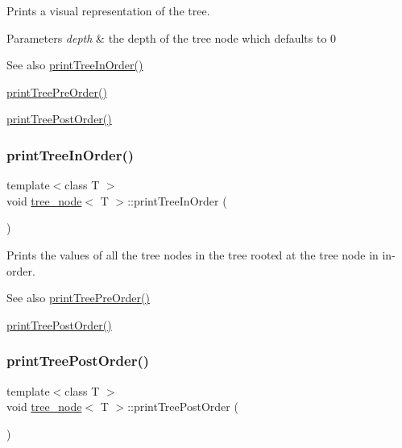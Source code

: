 Prints a visual representation of the tree. 
\begin{DoxyParams}{Parameters}
{\em depth} & the depth of the tree node which defaults to 0 \\
\hline
\end{DoxyParams}
\begin{DoxySeeAlso}{See also}
\hyperlink{classtree__node_ae87818a195621d4defc1cde67e7219ee}{print\+Tree\+In\+Order()} 

\hyperlink{classtree__node_a2ca4e1521e6620bbe2418a9636a109a8}{print\+Tree\+Pre\+Order()} 

\hyperlink{classtree__node_a4bfdd2b618c15252fcfbeab46ca05861}{print\+Tree\+Post\+Order()} 
\end{DoxySeeAlso}
\mbox{\label{classtree__node_ae87818a195621d4defc1cde67e7219ee}} 
\subsubsection{\texorpdfstring{print\+Tree\+In\+Order()}{printTreeInOrder()}}
{\footnotesize\ttfamily template$<$class T $>$ \\
void \hyperlink{classtree__node}{tree\+\_\+node}$<$ T $>$\+::print\+Tree\+In\+Order (\begin{DoxyParamCaption}{ }\end{DoxyParamCaption})}

Prints the values of all the tree nodes in the tree rooted at the tree node in in-\/order. \begin{DoxySeeAlso}{See also}
\hyperlink{classtree__node_a2ca4e1521e6620bbe2418a9636a109a8}{print\+Tree\+Pre\+Order()} 

\hyperlink{classtree__node_a4bfdd2b618c15252fcfbeab46ca05861}{print\+Tree\+Post\+Order()} 
\end{DoxySeeAlso}
\mbox{\label{classtree__node_a4bfdd2b618c15252fcfbeab46ca05861}} 
\subsubsection{\texorpdfstring{print\+Tree\+Post\+Order()}{printTreePostOrder()}}
{\footnotesize\ttfamily template$<$class T $>$ \\
void \hyperlink{classtree__node}{tree\+\_\+node}$<$ T $>$\+::print\+Tree\+Post\+Order (\begin{DoxyParamCaption}{ }\end{DoxyParamCaption})}

